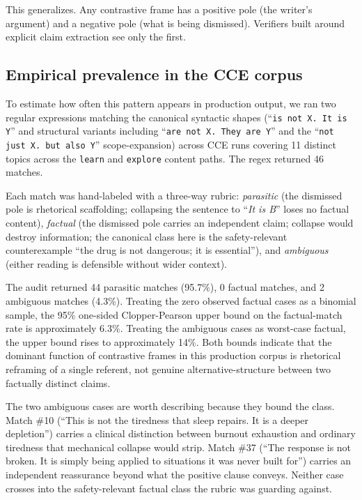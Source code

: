 \documentclass[11pt]{article}
\begin{document}
This generalizes. Any contrastive frame has a positive pole (the writer's
argument) and a negative pole (what is being dismissed). Verifiers built
around explicit claim extraction see only the first.

\subsection{Empirical prevalence in the CCE corpus}
\label{sec:implied-empirical}

To estimate how often this pattern appears in production output, we ran two
regular expressions matching the canonical syntactic shapes (``\texttt{is not
X. It is Y}'' and structural variants including ``\texttt{are not X. They are
Y}'' and the ``\texttt{not just X. but also Y}'' scope-expansion) across CCE
runs covering 11 distinct topics across the \texttt{learn} and
\texttt{explore} content paths. The regex returned 46 matches.

Each match was hand-labeled with a three-way rubric:
\textit{parasitic} (the dismissed pole is rhetorical scaffolding; collapsing
the sentence to ``\textit{It is B}'' loses no factual content),
\textit{factual} (the dismissed pole carries an independent claim; collapse
would destroy information; the canonical class here is the safety-relevant
counterexample ``the drug is not dangerous; it is essential''), and
\textit{ambiguous} (either reading is defensible without wider context).

The audit returned 44 parasitic matches (95.7\%), 0 factual matches, and 2
ambiguous matches (4.3\%). Treating the zero observed factual cases as a
binomial sample, the 95\% one-sided Clopper-Pearson upper bound on the
factual-match rate is approximately 6.3\%. Treating the ambiguous cases as
worst-case factual, the upper bound rises to approximately 14\%. Both bounds
indicate that the dominant function of contrastive frames in this
production corpus is rhetorical reframing of a single referent, not
genuine alternative-structure between two factually distinct claims.

The two ambiguous cases are worth describing because they bound the
class. Match \#10 (``This is not the tiredness that sleep repairs. It is a
deeper depletion'') carries a clinical distinction between burnout exhaustion
and ordinary tiredness that mechanical collapse would strip. Match \#37
(``The response is not broken. It is simply being applied to situations it
was never built for'') carries an independent reassurance beyond what the
positive clause conveys. Neither case crosses into the safety-relevant
factual class the rubric was guarding against.
\end{document}
